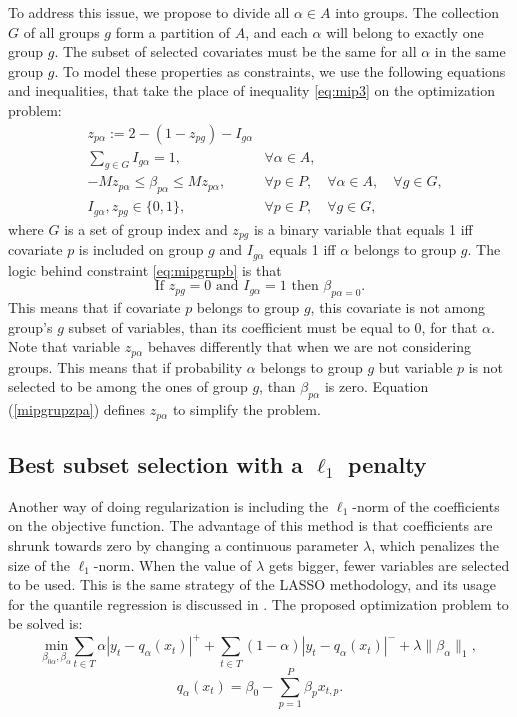 To address this issue, we propose to divide all $\alpha \in A$ into groups. The collection $G$ of all groups $g$ form a partition of $A$, and each $\alpha$ will belong to exactly one group $g$. 
The subset of selected covariates must be the same for all $\alpha$ in the same group $g$. To model these properties as constraints, we use the following equations and inequalities, that take the place of inequality \ref{eq:mip3} on the optimization problem:
\begin{eqnarray}
&z_{p \alpha} := 2 - ( 1-z_{pg}) - I_{g\alpha}& \label{mipgrupzpa} \\
& \sum\limits_{g \in G} I_{g\alpha} = 1, & \forall \alpha \in A,\label{eq:mipgrupa} \\
& -Mz_{p \alpha}  \leq  \beta_{p \alpha} \leq M z_{p \alpha}, & \forall p \in P, \quad \forall \alpha \in A, \quad \forall g \in G, \label{eq:mipgrupb} \\
& I_{g\alpha}, z_{pg} \in \{0,1\},& \forall p \in P, \quad \forall g \in G, 
\end{eqnarray}
where $G$ is a set of group index and $z_{pg}$ is a binary variable that equals 1 iff covariate $p$ is included on group $g$ and $I_{g\alpha}$ equals 1 iff $\alpha$ belongs to group $g$. 
The logic behind constraint \ref{eq:mipgrupb} is that 
$$\text{If }z_{pg} = 0 \text{ and }I_{g\alpha} =1 \text{ then } \beta_{p \alpha = 0}. $$
This means that if covariate $p$ belongs to group $g$, this covariate is not among group's $g$ subset of variables, than its coefficient must be equal to $0$, for that $\alpha$.
Note that variable $z_{p \alpha}$ behaves differently that when we are not considering groups. This means that if probability $\alpha$ belongs to group $g$ but variable $p$ is not selected to be among the ones of group $g$, than $\beta_{p\alpha}$ is zero.
Equation (\ref{mipgrupzpa}) defines $z_{p\alpha}$ to simplify the problem.

\subsection{Best subset selection with a $\ell_1$ penalty}
\label{sec:best-subset-ell1}

Another way of doing regularization is including the $\ell_1$-norm of the coefficients on the objective function. The advantage of this method is that coefficients are shrunk towards zero by changing a continuous parameter $\lambda$, which penalizes the size of the $\ell_1$-norm.  
When the value of $\lambda$ gets bigger, fewer variables are selected to be used. 
This is the same strategy of the LASSO methodology, and its usage for the quantile regression is discussed in \cite{li2012l1}.
The proposed optimization problem to be solved is:
\begin{equation}
\underset{\beta_{0\alpha},\beta_\alpha}{\text{min}} \sum_{t \in T}\alpha|y_{t}-q_\alpha(x_t)|^{+}+ \sum_{t \in T}(1-\alpha)|y_{t}-q_\alpha(x_t)|^{-}+\lambda\|\beta_\alpha\|_{1},
\label{eq:l1-qar-optim}
\end{equation}
\[
q_\alpha(x_t)=\beta_{0}-\sum_{p=1}^{P}\beta_{p}x_{t,p}.
\]

